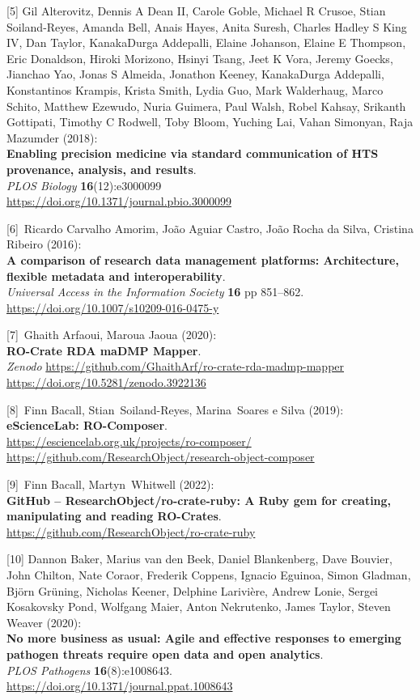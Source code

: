 {[}5{]} Gil Alterovitz, Dennis A Dean II, Carole Goble, Michael R
Crusoe, Stian Soiland-Reyes, Amanda Bell, Anais Hayes, Anita Suresh,
Charles Hadley S King IV, Dan Taylor, KanakaDurga Addepalli, Elaine
Johanson, Elaine E Thompson, Eric Donaldson, Hiroki Morizono, Hsinyi
Tsang, Jeet K Vora, Jeremy Goecks, Jianchao Yao, Jonas S Almeida,
Jonathon Keeney, KanakaDurga Addepalli, Konstantinos Krampis, Krista
Smith, Lydia Guo, Mark Walderhaug, Marco Schito, Matthew Ezewudo, Nuria
Guimera, Paul Walsh, Robel Kahsay, Srikanth Gottipati, Timothy C
Rodwell, Toby Bloom, Yuching Lai, Vahan Simonyan, Raja Mazumder
(2018):\\
\textbf{Enabling precision medicine via standard communication of HTS
provenance, analysis, and results}.\\
\emph{PLOS Biology} \textbf{16}(12):e3000099\\
\url{https://doi.org/10.1371/journal.pbio.3000099}

{[}6{]}~Ricardo Carvalho Amorim, João Aguiar Castro, João Rocha da
Silva, Cristina Ribeiro (2016):\\
\textbf{A comparison of research data management platforms:
Architecture, flexible metadata and interoperability}.\\
\emph{Universal Access in the Information Society} \textbf{16} pp
851--862.\\
\url{https://doi.org/10.1007/s10209-016-0475-y}

{[}7{]}~Ghaith Arfaoui, Maroua Jaoua (2020):\\
\textbf{RO-Crate RDA maDMP Mapper}.\\
\emph{Zenodo}
\url{https://github.com/GhaithArf/ro-crate-rda-madmp-mapper}\\
\url{https://doi.org/10.5281/zenodo.3922136}

{[}8{]}~Finn Bacall, Stian~Soiland-Reyes, Marina~Soares e Silva
(2019):\\
\textbf{eScienceLab: RO-Composer}.\\
\url{https://esciencelab.org.uk/projects/ro-composer/}~\\
\url{https://github.com/ResearchObject/research-object-composer}

{[}9{]}~Finn Bacall, Martyn~Whitwell (2022):\\
\textbf{GitHub -- ResearchObject/ro-crate-ruby: A Ruby gem for creating,
manipulating and reading RO-Crates}.\\
\url{https://github.com/ResearchObject/ro-crate-ruby}

{[}10{]} Dannon Baker, Marius van den Beek, Daniel Blankenberg, Dave
Bouvier, John Chilton, Nate Coraor, Frederik Coppens, Ignacio Eguinoa,
Simon Gladman, Björn Grüning, Nicholas Keener, Delphine Larivière,
Andrew Lonie, Sergei Kosakovsky Pond, Wolfgang Maier, Anton Nekrutenko,
James Taylor, Steven Weaver (2020):\\
\textbf{No more business as usual: Agile and effective responses to
emerging pathogen threats require open data and open analytics}.\\
\emph{PLOS Pathogens} \textbf{16}(8):e1008643.\\
\url{https://doi.org/10.1371/journal.ppat.1008643}

